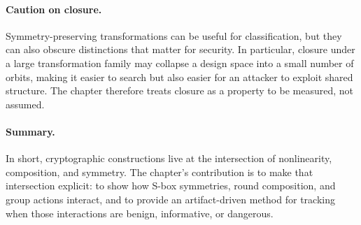 \paragraph{Caution on closure.} Symmetry-preserving transformations can be useful for classification, but they can also obscure distinctions that matter for security. In particular, closure under a large transformation family may collapse a design space into a small number of orbits, making it easier to search but also easier for an attacker to exploit shared structure. The chapter therefore treats closure as a property to be measured, not assumed.

\paragraph{Summary.} In short, cryptographic constructions live at the intersection of nonlinearity, composition, and symmetry. The chapter's contribution is to make that intersection explicit: to show how S-box symmetries, round composition, and group actions interact, and to provide an artifact-driven method for tracking when those interactions are benign, informative, or dangerous.

